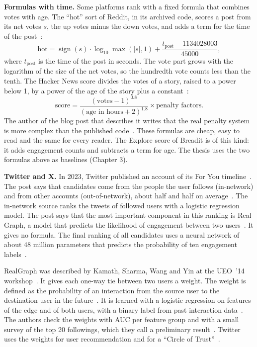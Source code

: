 \textbf{Formulas with time.} Some platforms rank with a fixed formula that combines votes with age. The ``hot'' sort of Reddit, in its archived code, scores a post from its net votes $s$, the up votes minus the down votes, and adds a term for the time of the post~:
\begin{equation}
  \text{hot} = \operatorname{sign}(s) \cdot \log_{10} \max(|s|, 1) + \frac{t_{\text{post}} - 1134028003}{45000},
  \label{eq:lit-hot}
\end{equation}
\noindent where $t_{\text{post}}$ is the time of the post in seconds. The vote part grows with the logarithm of the size of the net votes, so the hundredth vote counts less than the tenth. The Hacker News score divides the votes of a story, raised to a power below 1, by a power of the age of the story plus a constant~:
\begin{equation}
  \text{score} = \frac{(\text{votes} - 1)^{0.8}}{(\text{age in hours} + 2)^{1.8}} \times \text{penalty factors}.
  \label{eq:lit-hn}
\end{equation}
\noindent The author of the blog post that describes it writes that the real penalty system is more complex than the published code~. These formulas are cheap, easy to read and the same for every reader. The Explore score of Breadit is of this kind: it adds engagement counts and subtracts a term for age. The thesis uses the two formulas above as baselines (Chapter 3).

\textbf{Twitter and X.} In 2023, Twitter published an account of its For You timeline~. The post says that candidates come from the people the user follows (in-network) and from other accounts (out-of-network), about half and half on average~. The in-network source ranks the tweets of followed users with a logistic regression model. The post says that the most important component in this ranking is Real Graph, a model that predicts the likelihood of engagement between two users~. It gives no formula. The final ranking of all candidates uses a neural network of about 48 million parameters that predicts the probability of ten engagement labels~.

RealGraph was described by Kamath, Sharma, Wang and Yin at the UEO~'14 workshop~. It gives each one-way tie between two users a weight. The weight is defined as the probability of an interaction from the source user to the destination user in the future~. It is learned with a logistic regression on features of the edge and of both users, with a binary label from past interaction data~. The authors check the weights with AUC per feature group and with a small survey of the top 20 followings, which they call a preliminary result~. Twitter uses the weights for user recommendation and for a ``Circle of Trust''~.

